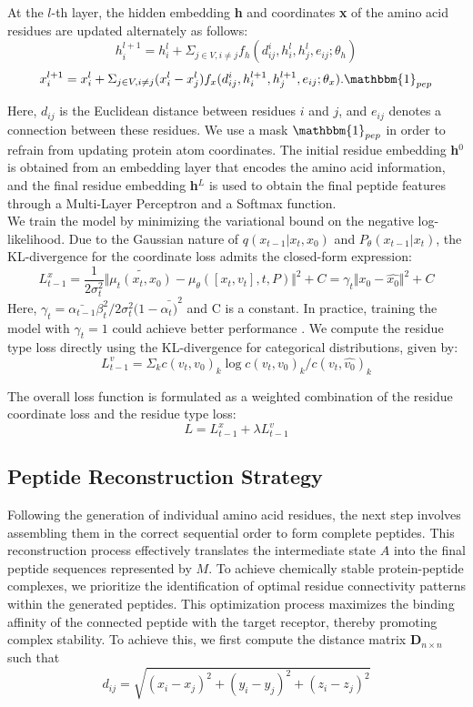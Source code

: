 At the $l$-th layer, the hidden embedding \textbf{h} and coordinates \textbf{x} of the amino acid residues are updated alternately as follows:
$$h_i^{l+1} = h_i^l + \Sigma_{j \in V, i\neq j}  f_h(d_{ij}^i, h_i^l, h_j^l, e_{ij}; \theta_h)$$
$$x_i^{l+1} = x_i^l + \Sigma_{j \in V, i\neq j} (x_i^l - x_j^l)  f_x(d_{ij}^i, h_i^{l+1}, h_j^{l+1}, e_{ij}; \theta_x).\mathbbm{1}_{pep}$$

Here, $d_{ij}$ is the Euclidean distance between residues $i$ and $j$, and $e_{ij}$ denotes a connection between these residues. We use a mask $\mathbbm{1}_{pep}$ in order to refrain from updating protein atom coordinates. The initial residue embedding \textbf{h$^0$} is obtained from an embedding layer that encodes the amino acid information, and the final residue embedding \textbf{h$^L$} is used to obtain the final peptide features through a Multi-Layer Perceptron and a Softmax function. \\

We train the model by minimizing the variational bound on the negative log-likelihood. Due to the Gaussian nature of $q(x_{t-1}|x_t, x_0)$ and $P_{\theta}(x_{t-1}|x_t)$, the KL-divergence for the coordinate loss admits the closed-form expression:
$$L_{t-1}^x = \frac{1}{2\sigma_t^2} \Vert{\tilde{\mu_t(x_t, x_0)} - \mu_{\theta}([x_t, v_t], t, P)}\Vert^2 + C = \gamma_t\Vert{x_0 - \hat{x_0}}\Vert^2 + C$$
Here, $\gamma_t = \bar{\alpha_{t-1}}\beta_t^2/2\sigma_t^2(1-\bar{\alpha_t)}^2$ and C is a constant. In practice, training the model with $\gamma_t = 1$ could achieve better performance \cite{ho2020denoising}. We compute the residue type loss directly using the KL-divergence for categorical distributions, given by:
$$L_{t-1}^v = \Sigma_{k} c(v_t, v_0)_{k} \log c(v_t, v_0)_{k}/c(v_t, \hat{v_0})_{k}$$

The overall loss function is formulated as a weighted combination of the residue coordinate loss and the residue type loss:
$$L = L_{t-1}^x + \lambda L_{t-1}^v$$

\subsection{Peptide Reconstruction Strategy}

Following the generation of individual amino acid residues, the next step involves assembling them in the correct sequential order to form complete peptides. This reconstruction process effectively translates the intermediate state $A$ into the final peptide sequences represented by $M$. To achieve chemically stable protein-peptide complexes, we prioritize the identification of optimal residue connectivity patterns within the generated peptides. This optimization process maximizes the binding affinity of the connected peptide with the target receptor, thereby promoting complex stability. To achieve this, we first compute the distance matrix $\mathbf{D}_{n \times n}$ such that
$$d_{ij} = \sqrt{(x_i - x_j)^2 + (y_i - y_j)^2 + (z_i - z_j)^2}$$


